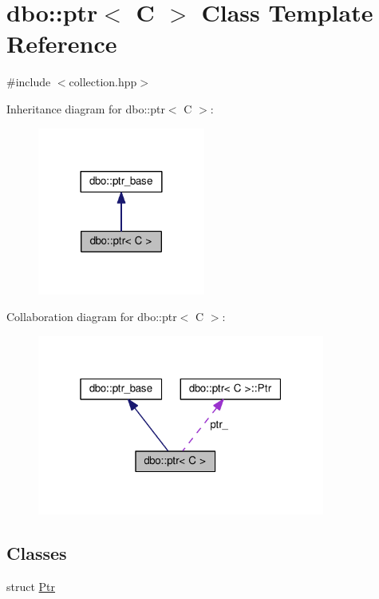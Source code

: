 \hypertarget{classdbo_1_1ptr}{\section{dbo\+:\+:ptr$<$ C $>$ Class Template Reference}
\label{classdbo_1_1ptr}
}


{\ttfamily \#include $<$collection.\+hpp$>$}



Inheritance diagram for dbo\+:\+:ptr$<$ C $>$\+:\nopagebreak
\begin{figure}[H]
\begin{center}
\leavevmode
\includegraphics[width=156pt]{classdbo_1_1ptr__inherit__graph}
\end{center}
\end{figure}


Collaboration diagram for dbo\+:\+:ptr$<$ C $>$\+:\nopagebreak
\begin{figure}[H]
\begin{center}
\leavevmode
\includegraphics[width=268pt]{classdbo_1_1ptr__coll__graph}
\end{center}
\end{figure}
\subsection*{Classes}
\begin{DoxyCompactItemize}
\item 
struct \hyperlink{structdbo_1_1ptr_1_1_ptr}{Ptr}
\end{DoxyCompactItemize}
